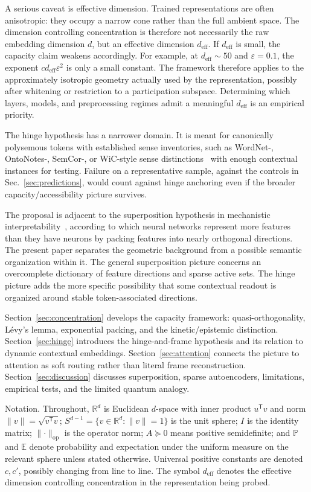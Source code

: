 \documentclass[
  aps,
  reprint,
  superscriptaddress,
  floatfix,
  nofootinbib,
  longbibliography
]{revtex4-2}
\newcommand{\R}{\mathbb{R}}
\newcommand{\E}{\mathbb{E}}
\newcommand{\Prob}{\mathbb{P}}
\newcommand{\Sph}[1]{S^{#1}}
\newcommand{\deff}{d_{\mathrm{eff}}}
\newcommand{\T}{^{\mathsf{T}}}
\newcommand{\opnorm}[1]{\lVert #1 \rVert_{\mathrm{op}}}
\newcommand{\norm}[1]{\lVert #1 \rVert}
\begin{document}
A serious caveat is effective dimension. Trained representations are
often anisotropic: they occupy a narrow cone rather than the full
ambient space. The dimension controlling concentration is therefore
not necessarily the raw embedding dimension $d$, but an effective
dimension $\deff$. If $\deff$ is small, the capacity claim weakens
accordingly. For example, at $\deff\sim 50$ and $\varepsilon=0.1$, the
exponent $c\deff\varepsilon^{2}$ is only a small constant. The framework
therefore applies to the approximately isotropic geometry actually used
by the representation, possibly after whitening or restriction to a
participation subspace. Determining which layers, models, and
preprocessing regimes admit a meaningful $\deff$ is an empirical
priority.

The hinge hypothesis has a narrower domain. It is meant for
canonically polysemous tokens with established sense inventories, such
as WordNet-, OntoNotes-, SemCor-, or WiC-style sense
distinctions~\cite{pilehvar2019wic} with enough contextual instances
for testing. Failure on a representative sample, against the controls
in Sec.~\ref{sec:predictions}, would count against hinge anchoring even
if the broader capacity/accessibility picture survives.

The proposal is adjacent to the superposition hypothesis in mechanistic
interpretability~\cite{elhage2022superposition}, according to which neural networks
represent more features than they have neurons by packing features into
nearly orthogonal directions. The present paper separates the
geometric background from a possible semantic organization within it.
The general superposition picture concerns an overcomplete dictionary
of feature directions and sparse active sets. The hinge picture adds
the more specific possibility that some contextual readout is organized
around stable token-associated directions.

Section~\ref{sec:concentration} develops the capacity framework:
quasi-orthogonality, L\'evy's lemma, exponential packing, and the
kinetic/epistemic distinction. Section~\ref{sec:hinge} introduces the
hinge-and-frame hypothesis and its relation to dynamic contextual
embeddings. Section~\ref{sec:attention} connects the picture to
attention as soft routing rather than literal frame reconstruction.
Section~\ref{sec:discussion} discusses superposition, sparse
autoencoders, limitations, empirical tests, and the limited quantum
analogy.

{Notation.}
Throughout, $\R^{d}$ is Euclidean $d$-space with inner product $u\T v$
and norm $\norm{v}=\sqrt{v\T v}$; $\Sph{d-1}=\{v\in\R^{d}:\norm{v}=1\}$
is the unit sphere; $I$ is the identity matrix; $\opnorm{\cdot}$ is the
operator norm; $A\succeq0$ means positive semidefinite; and $\Prob$ and
$\E$ denote probability and expectation under the uniform measure on
the relevant sphere unless stated otherwise. Universal positive
constants are denoted $c,c'$, possibly changing from line to line.
The symbol $\deff$ denotes the effective dimension controlling
concentration in the representation being probed.
\end{document}
